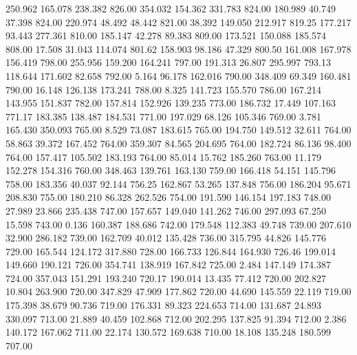  250.962  165.078  238.382       826.00
 354.032  154.362  331.783       824.00
 180.989   40.749   37.398       824.00
 220.974   48.492   48.442       821.00
  38.392  149.050  212.917       819.25
 177.217   93.443  277.361       810.00
 185.147   42.278   89.383       809.00
 173.521  150.088  185.574       808.00
  17.508   31.043  114.074       801.62
 158.903   98.186   47.329       800.50
 161.008  167.978  156.419       798.00
 255.956  159.200  164.241       797.00
 191.313   26.807  295.997       793.13
 118.644  171.602   82.658       792.00
   5.164   96.178  162.016       790.00
 348.409   69.349  160.481       790.00
  16.148  126.138  173.241       788.00
   8.325  141.723  155.570       786.00
 167.214  143.955  151.837       782.00
 157.814  152.926  139.235       773.00
 186.732   17.449  107.163       771.17
 183.385  138.487  184.531       771.00
 197.029   68.126  105.346       769.00
   3.781  165.430  350.093       765.00
   8.529   73.087  183.615       765.00
 194.750  149.512   32.611       764.00
  58.863   39.372  167.452       764.00
 359.307   84.565  204.695       764.00
 182.724   86.136   98.400       764.00
 157.417  105.502  183.193       764.00
  85.014   15.762  185.260       763.00
  11.179  152.278  154.316       760.00
 348.463  139.761  163.130       759.00
 166.418   54.151  145.796       758.00
 183.356   40.037   92.144       756.25
 162.867   53.265  137.848       756.00
 186.204   95.671  208.830       755.00
 180.210   86.328  262.526       754.00
 191.590  146.154  197.183       748.00
  27.989   23.866  235.438       747.00
 157.657  149.040  141.262       746.00
 297.093   67.250   15.598       743.00
   0.136  160.387  188.686       742.00
 179.548  112.383   49.748       739.00
 207.610   32.900  286.182       739.00
 162.709   40.012  135.428       736.00
 315.795   44.826  145.776       729.00
 165.544  124.172  317.880       728.00
 166.733  126.844  164.930       726.46
 199.014  149.660  190.121       726.00
 354.741  138.919  167.842       725.00
   2.484  147.149  174.387       724.00
 357.043  151.291  193.240       720.17
 190.014   13.435   77.412       720.00
 202.827   10.804  263.900       720.00
 347.829   47.909  177.862       720.00
  44.690  145.559   22.119       719.00
 175.398   38.679   90.736       719.00
 176.331   89.323  224.653       714.00
 131.687   24.893  330.097       713.00
  21.889   40.459  102.868       712.00
 202.295  137.825   91.394       712.00
   2.386  140.172  167.062       711.00
  22.174  130.572  169.638       710.00
  18.108  135.248  180.599       707.00
